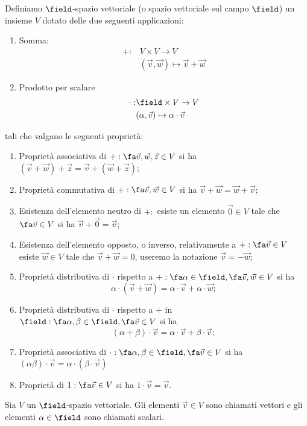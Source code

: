 \begin{definition}
    Definiamo $\field$-spazio vettoriale (o spazio vettoriale sul campo $\field$) un insieme $V$ dotato delle due seguenti applicazioni:
    \begin{enumerate}
        \item Somma:
        \begin{align*}
            +: &V \times V \rightarrow V \\
                &(\vec{v}, \vec{w}) \mapsto \vec{v} + \vec{w}
        \end{align*}
        \item Prodotto per scalare
        \begin{align*}
            \cdot: &\field \times V \rightarrow V \\
                    &(\alpha, \vec{v}) \mapsto \alpha \cdot \vec{v}
        \end{align*}
    \end{enumerate}
    tali che valgano le seguenti proprietà:
    \begin{enumerate}
        \renewcommand{\labelenumi}{(P\arabic{enumi})}
        \item Proprietà associativa di $+: \fa \vec{v}, \vec{w}, \vec{z} \in V$ si ha $(\vec{v} + \vec{w}) + \vec{z} = \vec{v} + (\vec{w} + \vec{z})$;
        \item Proprietà commutativa di $+: \fa \vec{v}, \vec{w} \in V$ si ha $\vec{v} + \vec{w} = \vec{w} + \vec{v}$;
        \item Esistenza dell'elemento neutro di $+: $ esiste un elemento $\vec{0} \in V$ tale che $\fa \vec{v} \in V$ si ha $\vec{v} + \vec{0} = \vec{v}$;
        \item Esistenza dell'elemento opposto, o inverso, relativamente a $+: \fa \vec{v} \in V$ esiste $\vec{w} \in V$ tale che $\vec{v} + \vec{w} = 0$, useremo la notazione $\vec{v} = -\vec{w}$;
        \item Proprietà distributiva di $\cdot$ rispetto a $+: \fa \alpha \in \field, \fa \vec{v}, \vec{w} \in V$ si ha
        \begin{equation*}
            \alpha \cdot (\vec{v} + \vec{w}) = \alpha \cdot \vec{v} + \alpha \cdot \vec{w};
        \end{equation*}
        \item Proprietà distributiva di $\cdot$ rispetto a $+$ in $\field: \fa \alpha, \beta \in \field, \fa \vec{v} \in V$ si ha
        \begin{equation*}
            (\alpha + \beta) \cdot \vec{v} = \alpha \cdot \vec{v} + \beta \cdot \vec{v};
        \end{equation*}
        \item Proprietà associativa di $\cdot: \fa \alpha, \beta \in \field, \fa \vec{v} \in V$ si ha $(\alpha\beta) \cdot \vec{v} = \alpha \cdot (\beta \cdot \vec{v})$
        \item Proprietà di $1: \fa \vec{v} \in V$ si ha $1 \cdot \vec{v} = \vec{v}$.
    \end{enumerate}
\end{definition}
Sia $V$ un $\field$-spazio vettoriale. Gli elementi $\vec{v} \in V$ sono chiamati vettori e gli elementi $\alpha \in \field$ sono chiamati scalari.

